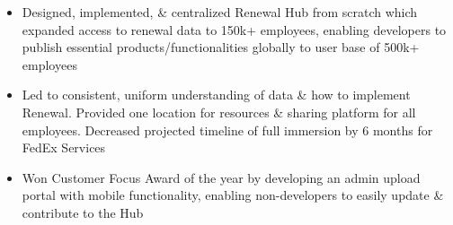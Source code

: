 \documentclass[10pt,a4paper,ragged2e]{altacv}
\begin{document}
\divider \newline
{}
\begin{itemize}
\item {Designed, implemented, \& centralized Renewal Hub from scratch which expanded access to renewal data to 150k+ employees, enabling developers to publish essential products/functionalities globally to user base of 500k+ employees}

\item{Led to consistent, uniform understanding of data \& how to implement Renewal. Provided one location for resources \& sharing platform for all employees. Decreased projected timeline of full immersion by 6 months for FedEx Services}

\item{Won Customer Focus Award of the year by developing an admin upload portal with mobile functionality, enabling non-developers to easily update \& contribute to the Hub}
\end{itemize}


\end{document}
